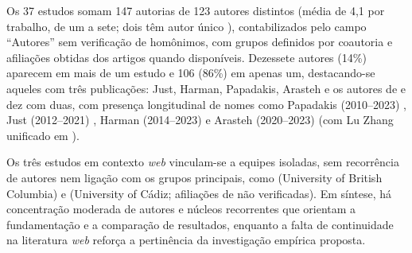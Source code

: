 Os 37 estudos somam 147 autorias de 123 autores distintos (média de 4,1 por trabalho, de um a sete; dois têm autor único \cite{nica2011, grano2019}), contabilizados pelo campo ``Autores'' sem verificação de homônimos, com grupos definidos por coautoria e afiliações obtidas dos artigos quando disponíveis. Dezessete autores (14\%) aparecem em mais de um estudo e 106 (86\%) em apenas um, destacando-se aqueles com três publicações: Just, Harman, Papadakis, Arasteh e os autores de  e dez com duas, com presença longitudinal de nomes como Papadakis (2010--2023) \cite{kintis2010, khanfir2023}, Just (2012--2021) \cite{just2012, petrovic2021}, Harman (2014--2023) \cite{yao2014, ojdanic2023} e Arasteh (2020--2023) \cite{shomali2020, arasteh2023} (com Lu Zhang unificado em ).

Os três estudos em contexto \textit{web} vinculam-se a equipes isoladas, sem recorrência de autores nem ligação com os grupos principais, como  (University of British Columbia) e  (University of Cádiz; afiliações de  não verificadas). Em síntese, há concentração moderada de autores e núcleos recorrentes que orientam a fundamentação e a comparação de resultados, enquanto a falta de continuidade na literatura \textit{web} reforça a pertinência da investigação empírica proposta.